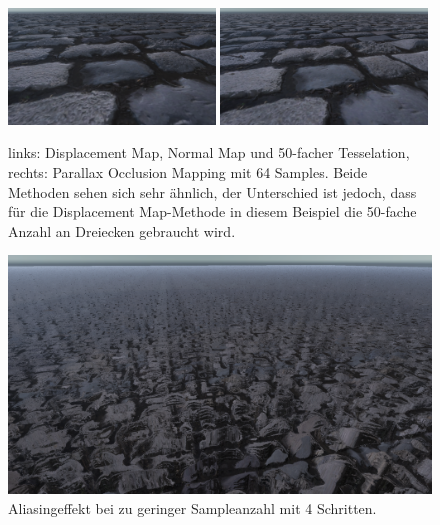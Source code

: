 \begin{figure}[ht]
	\includegraphics[width=0.49\textwidth]{Grafiken/Basics/Mapping/Vergleich_DisplacementNormalTesselated.png}
	\includegraphics[width=0.49\textwidth]{Grafiken/Basics/Mapping/Vergleich_POM_64Steps.png}
	\begin{footnotesize}
		\caption{links: Displacement Map, Normal Map und 50-facher Tesselation, rechts: Parallax Occlusion Mapping mit 64 Samples. 
		Beide Methoden sehen sich sehr ähnlich, der Unterschied ist jedoch, dass für die Displacement Map-Methode in diesem Beispiel die 50-fache Anzahl an
		Dreiecken gebraucht wird.}
	\end{footnotesize}
\end{figure}


\begin{figure}[h]
	\centering
	\includegraphics[width=1\textwidth]{Grafiken/Basics/Mapping/aliasing.png}
	\begin{footnotesize}
		\caption{Aliasingeffekt bei zu geringer Sampleanzahl mit 4 Schritten.}
		\label{fig:alias}
	\end{footnotesize}
\end{figure}
